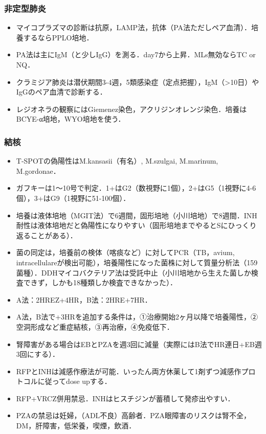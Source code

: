 \subsubsection{非定型肺炎}

\begin{itemize}
\item マイコプラズマの診断は抗原，LAMP法，抗体（PA法ただしペア血清）．培養するならPPLO培地．
\item PA法は主にIgM（と少しIgG）を測る．day7から上昇．MLs無効ならTC or NQ．
\item クラミジア肺炎は潜伏期間3-4週，5類感染症（定点把握），IgM（>10日）やIgGのペア血清で診断する．
\item レジオネラの観察にはGiemenez染色，アクリジンオレンジ染色．培養はBCYE-α培地，WYO培地を使う．
\end{itemize}


\subsubsection{結核}

\begin{itemize}
\item T-SPOTの偽陽性はM.kansasii（有名）, M.szulgai, M.marinum, M.gordonae．
\item ガフキーは1〜10号で判定．1+はG2（数視野に1個），2+はG5（1視野に4-6個），3+はG9（1視野に51-100個）．
\item 培養は液体培地（MGIT法）で6週間，固形培地（小川培地）で8週間．INH耐性は液体培地だと偽陽性になりやすい（固形培地までやるとSにひっくり返ることがある）．
\item 菌の同定は，培養前の検体（喀痰など）に対してPCR（TB，avium, intracellulareが検出可能），培養陽性になった菌株に対して質量分析法（159菌種）．DDHマイコバクテリア法は受託中止（小川培地から生えた菌しか検査できず，しかも18種類しか検査できなかった）．
\item A法：2HREZ+4HR，B法：2HRE+7HR．
\item A法，B法で+3HRを追加する条件は，①治療開始2ヶ月以降で培養陽性，②空洞形成など重症結核，③再治療，④免疫低下．
\item 腎障害がある場合はEBとPZAを週3回に減量（実際にはB法でHR連日+EB週3回にする）．
\item RFPとINHは減感作療法が可能．いったん両方休薬して1剤ずつ減感作プロトコルに従ってdose upする．
\item RFP+VRCZ併用禁忌．INHはヒスチジンが蓄積して発疹出やすい．
\item PZAの禁忌は妊婦，（ADL不良）高齢者．PZA眼障害のリスクは腎不全，DM，肝障害，低栄養，喫煙，飲酒．
\end{itemize}


